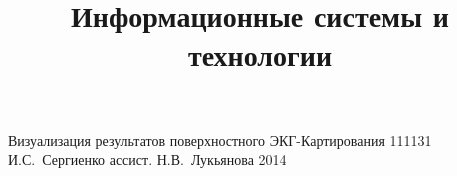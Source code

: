 \documentclass[a4paper,12pt]{memoir}
\begin{document}
\renewcommand{\contentsname}{{\Large{Содержание}\hfill}}

\title{Информационные системы и технологии}
{Визуализация результатов поверхностного ЭКГ-Картирования}
{111131}
{И.\+С.~Сергиенко}
{ассист.}
{Н.\+В.~Лукьянова}
{2014}



\newpage


\newpage
\end{document}
